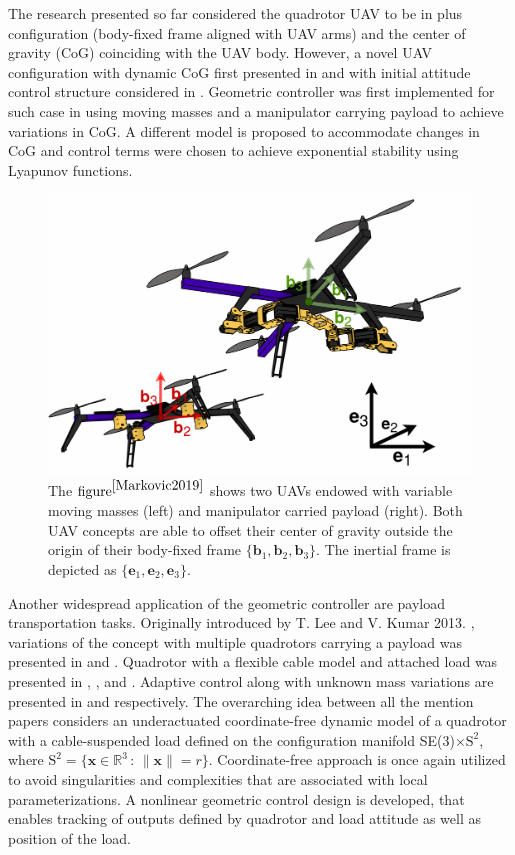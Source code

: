 The research presented so far considered the quadrotor UAV to be in plus configuration (body-fixed frame aligned with UAV arms) and the center of gravity (CoG) coinciding with the UAV body. However, a novel UAV configuration with dynamic CoG first presented in \cite{movingMass1} and \cite{movingMass2} with initial attitude control structure considered in \cite{movingMass3}. Geometric controller was first implemented for such case in \cite{Markovic2019} using moving masses and a manipulator carrying payload to achieve variations in CoG. A different model is proposed to accommodate changes in CoG and control terms were chosen to achieve exponential stability using Lyapunov functions.
\begin{figure}[H]
	\includegraphics[width=0.8\columnwidth]{figure/uav.png}	
	\centering
	\caption{The $\text{figure}^{\cite{Markovic2019}}$ shows two UAVs endowed with variable moving masses (left) and manipulator carried payload (right). Both UAV concepts are able to offset their center of gravity outside the origin of their body-fixed frame $\{\textbf{b}_1, \textbf{b}_2, \textbf{b}_3\}$. The inertial frame is depicted as $\{\textbf{e}_1, \textbf{e}_2, \textbf{e}_3\}$.  }
	\label{fig:uav_model}
\end{figure}

Another widespread application of the geometric controller are payload transportation tasks. Originally introduced by T. Lee and V. Kumar 2013. \cite{cable-load1}, variations of the concept with multiple quadrotors carrying a payload was presented in \cite{cable-load-multiple} and \cite{Lee2014GeometricCO}. Quadrotor with a flexible cable model and attached load was presented in \cite{tethered-quadrotor}, \cite{flexible-cable}, \cite{flexible-cable-dynamics} and \cite{stabilization-flexible-cable}. Adaptive control along with unknown mass variations are presented in  \cite{rigid-body-transport} and \cite{unknown-mass-transport} respectively.
The overarching idea between all the mention papers considers an underactuated coordinate-free dynamic model of a quadrotor with a cable-suspended load defined on the configuration manifold SE(3)$\times\text{S}^2$, where $\text{S}^2 = \{\textbf{x} \in \mathbb{R}^{3} \,:\, \lVert \textbf{x} \rVert = r \}$. Coordinate-free approach is once again utilized to avoid singularities and complexities that are associated with local parameterizations. A nonlinear geometric control design is developed, that enables tracking of outputs defined by quadrotor and load attitude as well as position of the load. 

